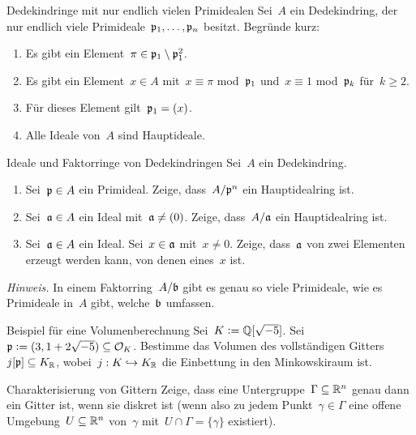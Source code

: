 \documentclass{uebblatt}
\begin{document}

\begin{aufgabe}{Dedekindringe mit nur endlich vielen Primidealen}
Sei~$A$ ein Dedekindring, der nur endlich viele
Primideale~$\mathfrak{p}_1,\ldots,\mathfrak{p}_n$ besitzt. Begründe kurz:
\begin{enumerate}
\item Es gibt ein Element~$\pi \in \mathfrak{p}_1 \setminus \mathfrak{p}_1^2$.
\item Es gibt ein Element~$x \in A$ mit~$x \equiv \pi$
mod~$\mathfrak{p}_1$ und~$x \equiv 1$ mod~$\mathfrak{p}_k$ für~$k \geq 2$.
\item Für dieses Element gilt~$\mathfrak{p}_1 = (x)$.
\item Alle Ideale von~$A$ sind Hauptideale.
\end{enumerate}
\end{aufgabe}

\begin{aufgabe}{Ideale und Faktorringe von Dedekindringen}
Sei~$A$ ein Dedekindring.
\begin{enumerate}
\item Sei~$\mathfrak{p} \in A$ ein Primideal. Zeige, dass~$A/\mathfrak{p}^n$ ein Hauptidealring
ist.
\item Sei~$\mathfrak{a} \in A$ ein Ideal mit~$\mathfrak{a} \neq (0)$. Zeige, dass~$A/\mathfrak{a}$ ein
Hauptidealring ist.
\item Sei~$\mathfrak{a} \in A$ ein Ideal. Sei~$x \in \mathfrak{a}$ mit~$x \neq 0$. Zeige,
dass~$\mathfrak{a}$ von zwei Elementen erzeugt werden kann, von denen eines~$x$ ist.
\end{enumerate}
{\tiny\emph{Hinweis.} In einem Faktorring~$A/\mathfrak{b}$ gibt es genau so viele
Primideale, wie es Primideale in~$A$ gibt, welche~$\mathfrak{b}$ umfassen.\par}
\end{aufgabe}

\begin{aufgabe}{Beispiel für eine Volumenberechnung}
Sei~$K \vcentcolon= \mathbb{Q}[\sqrt{-5}]$. Sei~$\mathfrak{p} \vcentcolon= (3, 1 + 2\sqrt{-5}) \subseteq
\mathcal{O}_K$. Bestimme das Volumen des vollständigen
Gitters~$j[\mathfrak{p}] \subseteq K_{\mathbb{R}}$, wobei~$j : K \hookrightarrow K_{\mathbb{R}}$ die
Einbettung in den Minkowskiraum ist.
\end{aufgabe}

\begin{aufgabe}{Charakterisierung von Gittern}
Zeige, dass eine Untergruppe~$\Gamma \subseteq \mathbb{R}^n$ genau dann ein Gitter
ist, wenn sie diskret ist (wenn also zu jedem Punkt~$\gamma \in \Gamma$ eine
offene Umgebung~$U \subseteq \mathbb{R}^n$ von~$\gamma$ mit~$U \cap \Gamma =
\{\gamma\}$ existiert).
\end{aufgabe}
\end{document}

